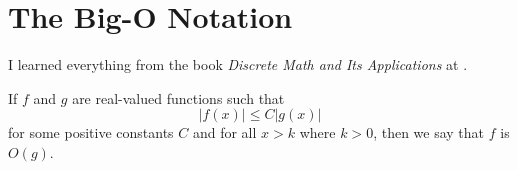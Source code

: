 \chapter{The Big-O Notation} \label{chap:bigOnotation}

I learned everything from the book \textit{Discrete Math and Its Applications} at \cite{rosen2019discrete}.

\begin{definition}
    If $f$ and $g$ are real-valued functions such that
    $$|f(x)| \leq C|g(x)|$$
    for some positive constants $C$ and for all $x > k$ where $k > 0$, then we say that $f$ is $O(g)$. 
\end{definition}